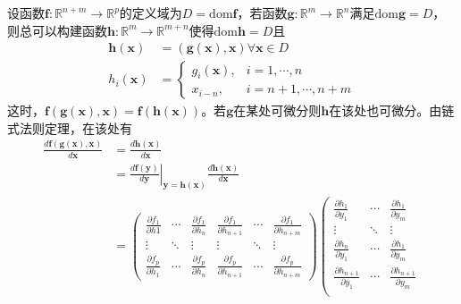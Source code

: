 \documentclass[main.tex]{subfiles}
\begin{document}
\begin{example}\label{exp:II.12.1}
设函数$\mathbf{f}:\mathbb{R}^{n+m}\rightarrow\mathbb{R}^p$的定义域为$D=\mathrm{dom}\mathbf{f}$，若函数$\mathbf{g}:\mathbb{R}^m\rightarrow\mathbb{R}^n$满足$\mathrm{dom}\mathbf{g}=D$，则总可以构建函数$\mathbf{h}:\mathbb{R}^m\rightarrow\mathbb{R}^{m+n}$使得$\mathrm{dom}\mathbf{h}=D$且
\begin{align*}
    \mathbf{h}\left(\mathbf{x}\right)&=\left(\mathbf{g}\left(\mathbf{x}\right),\mathbf{x}\right)\forall\mathbf{x}\in D\\
    h_i\left(\mathbf{x}\right)&=\left\{\begin{array}{ll}
    g_i\left(\mathbf{x}\right),&i=1,\cdots,n\\
    x_{i-n},&i=n+1,\cdots,n+m
    \end{array}\right.
\end{align*}
这时，$\mathbf{f}\left(\mathbf{g}\left(\mathbf{x}\right),\mathbf{x}\right)=\mathbf{f}\left(\mathbf{h}\left(\mathbf{x}\right)\right)$。若$\mathbf{g}$在某处可微分则$\mathbf{h}$在该处也可微分。由链式法则定理，在该处有
\begin{align*}
    \frac{d\mathbf{f}\left(\mathbf{g}\left(\mathbf{x}\right),\mathbf{x}\right)}{d\mathbf{x}}&=\frac{d\mathbf{h}\left(\mathbf{x}\right)}{d\mathbf{x}}\\
    &=\left.\frac{d\mathbf{f}\left(\mathbf{y}\right)}{d\mathbf{y}}\right|_{\mathbf{y}=\mathbf{h}\left(\mathbf{x}\right)}\frac{d\mathbf{h}\left(\mathbf{x}\right)}{d\mathbf{x}}\\
    &=\left(\begin{array}{cccccc}
    \frac{\partial f_1}{\partial h1}&\cdots&\frac{\partial f_1}{\partial h_n}&\frac{\partial f_1}{\partial h_{n+1}}&\cdots&\frac{\partial f_1}{\partial h_{n+m}}\\
    \vdots&\ddots&\vdots&\vdots&\ddots&\vdots\\
    \frac{\partial f_p}{\partial h_1}&\cdots&\frac{\partial f_p}{\partial h_n}&\frac{\partial f_p}{\partial h_{n+1}}&\cdots&\frac{\partial f_p}{\partial h_{n+m}}
    \end{array}\right)\left(\begin{array}{ccc}
    \frac{\partial h_1}{\partial y_1}&\cdots&\frac{\partial h_1}{\partial y_m}\\
    \vdots&\ddots&\vdots\\
    \frac{\partial h_n}{\partial y_1}&\cdots&\frac{\partial h_1}{\partial y_m}\\
    \frac{\partial h_{n+1}}{\partial y_1}&\cdots&\frac{\partial h_{n+1}}{\partial y_m}\\

\end{array}
\end{align*}
\end{example}
\end{document}
